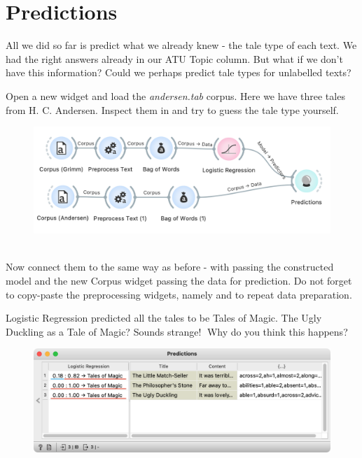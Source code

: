 \chapter{Predictions}

All we did so far is predict what we already knew - the tale type of each text. We had the right answers already in our ATU Topic column. But what if we don't have this information? Could we perhaps predict tale types for unlabelled texts?

Open a new  widget and load the \emph{andersen.tab} corpus. Here we have three tales from H. C. Andersen. Inspect them in  and try to guess the tale type yourself.

\vspace{-0.2cm}
\begin{figure}[h]
  \centering
  \includegraphics[width=0.8\linewidth]{workflow.png}%
  \caption{$\;$}
\end{figure}
\vspace{-0.3cm}

Now connect them to  the same way as before - with  passing the constructed model and the new Corpus widget passing the data for prediction. Do not forget to copy-paste the preprocessing widgets, namely  and  to repeat data preparation.

Logistic Regression predicted all the tales to be Tales of Magic. The Ugly Duckling as a Tale of Magic? Sounds strange! Why do you think this happens?

\vspace{-0.2cm}
\begin{figure}[h]
  \centering
  \includegraphics[width=\linewidth]{predictions.png}%
  \caption{$\;$}
\end{figure}
\vspace{-0.3cm}
